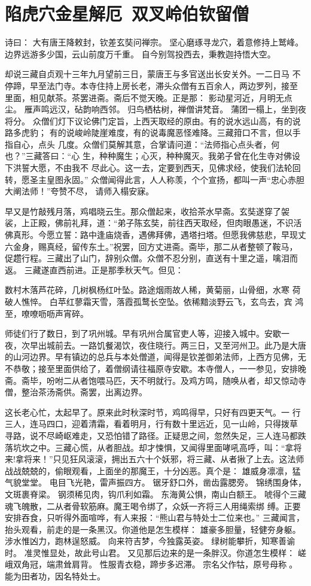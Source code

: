 \chapter{陷虎穴金星解厄~双叉岭伯钦留僧}

诗曰：
大有唐王降敕封，钦差玄奘问禅宗。
坚心磨琢寻龙穴，着意修持上鹫峰。
边界远游多少国，云山前度万千重。
自今别驾投西去，秉教迦持悟大空。

却说三藏自贞观十三年九月望前三日，蒙唐王与多官送出长安关外。一二日马
不停蹄，早至法门寺。本寺住持上房长老，滞头众僧有五百余人，两边罗列，接至
里面，相见献茶。茶罢进斋。斋后不觉天晚。正是那：
影动星河近，月明无点尘。
雁声鸣远汉，砧韵响西邻。
归鸟栖枯树，禅僧讲梵音。
蒲团一榻上，坐到夜将分。
众僧们灯下议论佛门定旨，上西天取经的原由。有的说水远山高，有的说路多虎豹；
有的说峻岭陡崖难度，有的说毒魔恶怪难降。三藏箝口不言，但以手指自心，点头
几度。众僧们莫解其意，合掌请问道：“法师指心点头者，何也？”三藏答曰：“心
生，种种魔生；心灭，种种魔灭。我弟子曾在化生寺对佛设下洪誓大愿，不由我不
尽此心。这一去，定要到西天，见佛求经，使我们法轮回转，愿圣主皇图永固。”
众僧闻得此言，人人称羡，个个宣扬，都叫一声“忠心赤胆大阐法师！”夸赞不尽，
请师入榻安寐。

早又是竹敲残月落，鸡唱晓云生。那众僧起来，收拾茶水早斋。玄奘遂穿了袈
裟，上正殿，佛前礼拜，道：“弟子陈玄奘，前往西天取经，但肉眼愚迷，不识活
佛真形。今愿立誓：路中逢庙烧香，遇佛拜佛，遇塔扫塔。但愿我佛慈悲，早现丈
六金身，赐真经，留传东土。”祝罢，回方丈进斋。斋毕，那二从者整顿了鞍马，
促趱行程。三藏出了山门，辞别众僧。众僧不忍分别，直送有十里之遥，噙泪而返。
三藏遂直西前进。正是那季秋天气。但见：

数村木落芦花碎，几树枫杨红叶坠。路途烟雨故人稀，黄菊丽，山骨细，水寒
荷破人憔悴。
白苹红蓼霜天雪，落霞孤鹜长空坠。依稀黯淡野云飞，玄鸟去，宾
鸿至，嘹嘹呖呖声宵碎。

师徒们行了数日，到了巩州城。早有巩州合属官吏人等，迎接入城中。安歇一
夜，次早出城前去。一路饥餐渴饮，夜住晓行。两三日，又至河州卫。此乃是大唐
的山河边界。早有镇边的总兵与本处僧道，闻得是钦差御弟法师，上西方见佛，无
不恭敬；接至里面供给了，着僧纲请往福原寺安歇。本寺僧人，一一参见，安排晚
斋。斋毕，吩咐二从者饱喂马匹，天不明就行。及鸡方鸣，随唤从者，却又惊动寺
僧，整治茶汤斋供。斋罢，出离边界。

这长老心忙，太起早了。原来此时秋深时节，鸡鸣得早，只好有四更天气。一
行三人，连马四口，迎着清霜，看着明月，行有数十里远近，见一山岭，只得拨草
寻路，说不尽崎岖难走，又恐怕错了路径。正疑思之间，忽然失足，三人连马都跌
落坑坎之中。三藏心慌，从者胆战。却才悚惧，又闻得里面哮吼高呼，叫：“拿将
来!拿将来！”只见狂风滚滚，拥出五六十个妖邪，将三藏、从者揪了上去。这法师
战战兢兢的，偷眼观看，上面坐的那魔王，十分凶恶。真个是：
雄威身凛凛，猛气貌堂堂。
电目飞光艳，雷声振四方。
锯牙舒口外，凿齿露腮旁。
锦绣围身体，文斑裹脊梁。
钢须稀见肉，钩爪利如霜。
东海黄公惧，南山白额王。
唬得个三藏魂飞魄散，二从者骨软筋麻。魔王喝令绑了，众妖一齐将三人用绳索绑
缚。正要安排吞食，只听得外面喧哗，有人来报：“熊山君与特处士二位来也。”
三藏闻言，抬头观看，前走的是一条黑汉。你道他是怎生模样：
雄豪多胆量，轻健夯身躯。
涉水惟凶力，跑林逞怒威。
向来符吉梦，今独露英姿。
绿树能攀折，知寒善谕时。
准灵惟显处，故此号山君。
又见那后边来的是一条胖汉。你道怎生模样：
嵯峨双角冠，端肃耸肩背。
性服青衣稳，蹄步多迟滞。
宗名父作牯，原号母称。
能为田者功，因名特处士。

